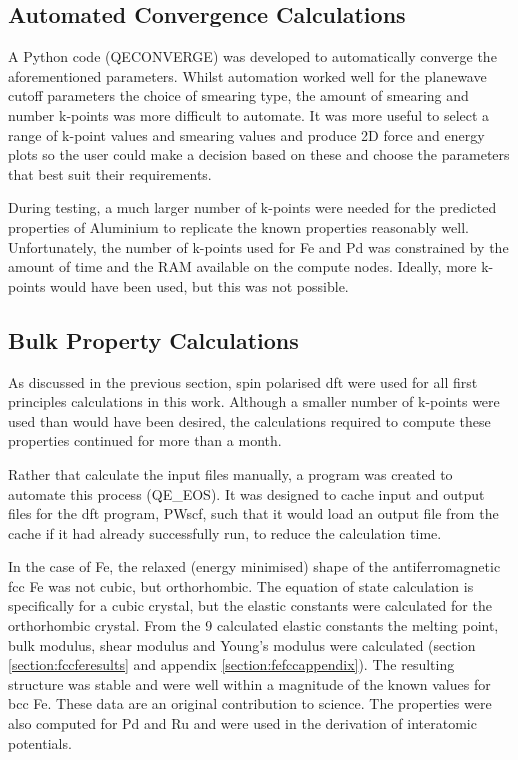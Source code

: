 \subsection{Automated Convergence Calculations}

A Python code (QECONVERGE) was developed to automatically converge the aforementioned parameters.  Whilst automation worked well for the planewave cutoff parameters the choice of smearing type, the amount of smearing and number k-points was more difficult to automate.  It was more useful to select a range of k-point values and smearing values and produce 2D force and energy plots so the user could make a decision based on these and choose the parameters that best suit their requirements.

During testing, a much larger number of k-points were needed for the predicted properties of Aluminium to replicate the known properties reasonably well.  Unfortunately, the number of k-points used for Fe and Pd was constrained by the amount of time and the RAM available on the compute nodes.  Ideally, more k-points would have been used, but this was not possible.


\subsection{Bulk Property Calculations}

As discussed in the previous section, spin polarised \acrshort{dft} were used for all first principles calculations in this work.  Although a smaller number of k-points were used than would have been desired, the calculations required to compute these properties continued for more than a month.

Rather that calculate the input files manually, a program was created to automate this process (QE\_EOS).  It was designed to cache input and output files for the \acrshort{dft} program, PWscf, such that it would load an output file from the cache if it had already successfully run, to reduce the calculation time.

In the case of Fe, the relaxed (energy minimised) shape of the antiferromagnetic \acrshort{fcc} Fe was not cubic, but orthorhombic.  The equation of state calculation is specifically for a cubic crystal, but the elastic constants were calculated for the orthorhombic crystal.  From the 9 calculated elastic constants the melting point, bulk modulus, shear modulus and Young's modulus were calculated (section \ref{section:fccferesults} and appendix \ref{section:fefccappendix}).  The resulting structure was stable and were well within a magnitude of the known values for \acrshort{bcc} Fe.  These data are an original contribution to science.  The properties were also computed for Pd and Ru and were used in the derivation of interatomic potentials.


